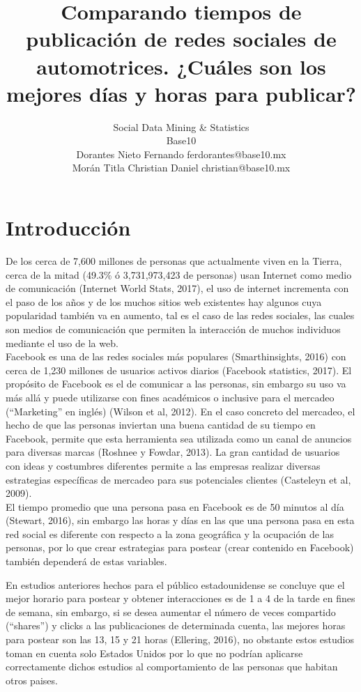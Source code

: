 \documentclass[a4paper,10pt]{article}
\title{Comparando tiempos de publicación de redes sociales de automotrices. 
¿Cuáles son los mejores días y horas para publicar?}
\author{Social Data Mining \& Statistics \\
        Base10\\
        \scriptsize Dorantes Nieto Fernando ferdorantes@base10.mx \\
        \scriptsize Morán Titla Christian Daniel christian@base10.mx}
\date{}
\begin{document}
\maketitle


\section{Introducción}
De los cerca de 7,600 millones de personas que  actualmente viven en la Tierra, cerca
de la mitad (49.3\% ó 3,731,973,423 de personas) usan Internet como medio de comunicación (Internet World Stats, 2017),
el uso de internet incrementa con el paso de los años y de los muchos sitios web existentes
hay algunos cuya popularidad también va en aumento, tal es el caso de las redes sociales,
las cuales son  medios de comunicación que permiten la interacción 
de muchos individuos mediante el uso de la web.\\

Facebook es una de las redes sociales más populares (Smarthinsights, 2016) con cerca de
1,230 millones de usuarios activos diarios (Facebook statistics, 2017).
El propósito de Facebook es el de comunicar  a las personas, sin embargo
su uso va más allá y puede utilizarse con fines académicos o inclusive para el mercadeo (``Marketing'' en inglés) (Wilson et al, 2012).
En el caso concreto del mercadeo, el hecho de que las personas inviertan una buena cantidad de su tiempo en Facebook, 
permite que esta herramienta sea utilizada como un canal de anuncios para diversas marcas (Roshnee y Fowdar, 2013).
La gran cantidad de usuarios con ideas y costumbres diferentes permite a las empresas
realizar diversas estrategias específicas de mercadeo para sus potenciales clientes 
(Casteleyn et al, 2009).\\

El tiempo promedio que una persona pasa en Facebook es de 50 minutos al día (Stewart, 2016),
sin embargo las horas y días en las que una persona pasa en esta red social es diferente
con respecto a la zona geográfica y la ocupación de las personas, por lo que crear estrategias 
para postear (crear contenido en Facebook) también dependerá de estas variables.

En estudios anteriores hechos para el público estadounidense se concluye que el mejor
horario para postear y obtener interacciones es  de 1 a 4 de la tarde en fines de semana, sin embargo, 
si se desea aumentar el número de veces compartido (``shares'') y clicks a las publicaciones de determinada cuenta,
las mejores horas para postear son las 13, 15 y 21 horas (Ellering, 2016), no obstante estos estudios
toman en cuenta solo Estados Unidos por lo que no podrían aplicarse correctamente dichos estudios
al comportamiento de las personas que habitan otros paises.\\
\end{document}
